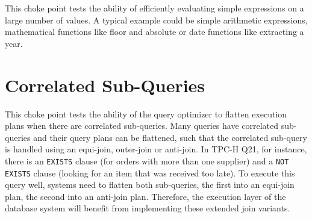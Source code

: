 



This choke point tests the ability of efficiently evaluating simple expressions on a large number of values. A typical example could be simple arithmetic expressions, mathematical functions like floor and absolute or date functions like extracting a year.



%
%
%


\section{Correlated Sub-Queries}



This choke point tests the ability of the query optimizer to flatten execution plans when there are correlated sub-queries. Many queries have correlated sub-queries and their query plans can be flattened,
such that the correlated sub-query is handled using an equi-join, outer-join or anti-join.
In TPC-H Q21, for instance, there is an \lstinline{EXISTS} clause (for orders with more than one supplier) and a \lstinline{NOT EXISTS} clause (looking for an item that was received too late).
To execute this query well, systems need to flatten both sub-queries, the first into an equi-join plan, the second into an anti-join plan.
Therefore, the execution layer of the database system will benefit from implementing these extended join variants.

